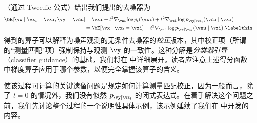 \documentclass[../../book-main_zh.tex]{subfiles}
\begin{document}
（通过 Tweedie 公式）给出我们提出的去噪器为
\begin{align*}
    \bE[ \vx \mid \vx_t=\vxi, \vy=\vnu]
    &=
    \vxi + t^2 \nabla_{\vxi}\log p_t(\vxi) + t^2 \nabla_{\vxi}\log p_{\vy \mid
    \vx_t}(\vnu \mid \vxi)
    \\
    &=
    \bE[\vx \mid \vx_t=\vxi] + t^2 \nabla_{\vxi}\log p_{\vy \mid \vx_t}(\vnu\mid
    \vxi).
    \labelthis \label{eq:posterior-sampling-denoiser-decomposition}
\end{align*}
得到的算子可以解释为噪声观测的无条件去噪器的\textit{校正}版本，其中校正项（所谓的“测量匹配”项）强制保持与观测 $\vy$ 的一致性。这种分解是\textit{分类器引导}（classifier guidance）的基础，我们将在  中详细展开。读者应注意上述得分函数中梯度算子应用于哪个参数，以便完全掌握该算子的含义。

使该过程可计算的关键遗留问题是规定如何计算测量匹配校正，因为一般而言，除了 $t = 0$ 的情况外，我们没有似然 $p_{\vy \mid \vx_t}$ 的闭式表达式。在着手解决这个问题之前，我们先讨论整个过程的一个说明性具体示例，该示例延续了我们在  中开发的内容。
\end{document}
